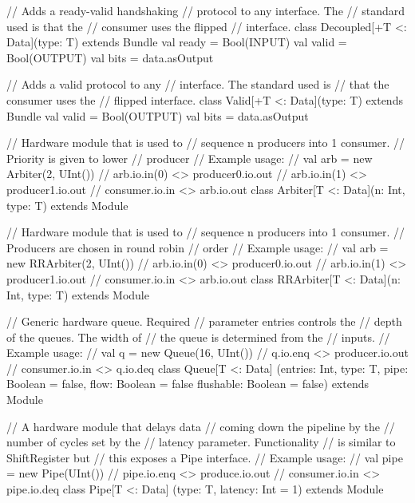 \documentclass[10pt,twocolumn]{article}
\begin{document}
\begin{scala}
// Adds a ready-valid handshaking
// protocol to any interface. The 
// standard used is that the
// consumer uses the flipped
// interface.
class Decoupled[+T <: Data](type: T) 
    extends Bundle {
  val ready = Bool(INPUT)
  val valid = Bool(OUTPUT)
  val bits  = data.asOutput
}

// Adds a valid protocol to any
// interface. The standard used is
// that the consumer uses the
// flipped interface.
class Valid[+T <: Data](type: T) 
    extends Bundle {
  val valid = Bool(OUTPUT)
  val bits = data.asOutput
}

// Hardware module that is used to 
// sequence n producers into 1 consumer. 
// Priority is given to lower
// producer
// Example usage:
//    val arb = new Arbiter(2, UInt())
//    arb.io.in(0) <> producer0.io.out
//    arb.io.in(1) <> producer1.io.out
//    consumer.io.in <> arb.io.out
class Arbiter[T <: Data](n: Int, type: T) 
  extends Module 

// Hardware module that is used to 
// sequence n producers into 1 consumer.
// Producers are chosen in round robin 
// order
// Example usage:
//    val arb = new RRArbiter(2, UInt())
//    arb.io.in(0) <> producer0.io.out
//    arb.io.in(1) <> producer1.io.out
//    consumer.io.in <> arb.io.out
class RRArbiter[T <: Data](n: Int, type: T) 
  extends Module 

// Generic hardware queue. Required
// parameter entries controls the
// depth of the queues. The width of
// the queue is determined from the 
// inputs.
// Example usage:
//    val q = new Queue(16, UInt())
//    q.io.enq <> producer.io.out
//    consumer.io.in <> q.io.deq
class Queue[T <: Data]
    (entries: Int, type: T,
     pipe: Boolean = false,
     flow: Boolean = false
     flushable: Boolean = false)
    extends Module  

// A hardware module that delays data 
// coming down the pipeline by the 
// number of cycles set by the 
// latency parameter. Functionality
// is similar to ShiftRegister but
// this exposes a Pipe interface.
// Example usage:
//    val pipe = new Pipe(UInt())
//    pipe.io.enq <> produce.io.out
//    consumer.io.in <> pipe.io.deq
class Pipe[T <: Data]
    (type: T, latency: Int = 1) extends Module

\end{scala}

\end{document}
